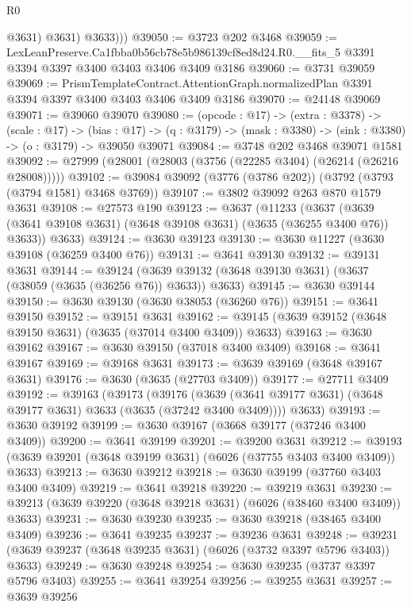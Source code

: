 \begin{lexlean}{R0}
\begin{coremodule}
              @3631)
            @3631)
          @3633)))
@39050 := @3723 @202 @3468
@39059 := LexLeanPreserve.Ca1fbba0b56cb78e5b986139cf8ed8d24.R0.__fits_5
    @3391
    @3394
    @3397
    @3400
    @3403
    @3406
    @3409
    @3186
@39060 := @3731 @39059
@39069 := PrismTemplateContract.AttentionGraph.normalizedPlan
    @3391
    @3394
    @3397
    @3400
    @3403
    @3406
    @3409
    @3186
@39070 := @24148 @39069
@39071 := @39060 @39070
@39080 := (opcode : @17) ->
  (extra : @3378) ->
  (scale : @17) ->
  (bias : @17) -> (q : @3179) -> (mask : @3380) -> (sink : @3380) -> (o : @3179) -> @39050 @39071
@39084 := @3748 @202 @3468 @39071 @1581
@39092 := @27999 (@28001 (@28003 (@3756 (@22285 @3404) (@26214 (@26216 @28008)))))
@39102 := @39084 @39092 (@3776 (@3786 @202)) (@3792 (@3793 (@3794 @1581) @3468 @3769))
@39107 := @3802 @39092 @263 @870 @1579 @3631
@39108 := @27573 @190
@39123 := @3637
    (@11233
      (@3637 (@3639 (@3641 @39108 @3631) (@3648 @39108 @3631) (@3635 (@36255 @3400 @76)) @3633))
      @3633)
@39124 := @3630 @39123
@39130 := @3630 @11227 (@3630 @39108 (@36259 @3400 @76))
@39131 := @3641 @39130
@39132 := @39131 @3631
@39144 := @39124
    (@3639 @39132 (@3648 @39130 @3631) (@3637 (@38059 (@3635 (@36256 @76)) @3633)) @3633)
@39145 := @3630 @39144
@39150 := @3630 @39130 (@3630 @38053 (@36260 @76))
@39151 := @3641 @39150
@39152 := @39151 @3631
@39162 := @39145 (@3639 @39152 (@3648 @39150 @3631) (@3635 (@37014 @3400 @3409)) @3633)
@39163 := @3630 @39162
@39167 := @3630 @39150 (@37018 @3400 @3409)
@39168 := @3641 @39167
@39169 := @39168 @3631
@39173 := @3639 @39169 (@3648 @39167 @3631)
@39176 := @3630 (@3635 (@27703 @3409))
@39177 := @27711 @3409
@39192 := @39163
    (@39173
      (@39176 (@3639 (@3641 @39177 @3631) (@3648 @39177 @3631) @3633 (@3635 (@37242 @3400 @3409))))
      @3633)
@39193 := @3630 @39192
@39199 := @3630 @39167 (@3668 @39177 (@37246 @3400 @3409))
@39200 := @3641 @39199
@39201 := @39200 @3631
@39212 := @39193 (@3639 @39201 (@3648 @39199 @3631) (@6026 (@37755 @3403 @3400 @3409)) @3633)
@39213 := @3630 @39212
@39218 := @3630 @39199 (@37760 @3403 @3400 @3409)
@39219 := @3641 @39218
@39220 := @39219 @3631
@39230 := @39213 (@3639 @39220 (@3648 @39218 @3631) (@6026 (@38460 @3400 @3409)) @3633)
@39231 := @3630 @39230
@39235 := @3630 @39218 (@38465 @3400 @3409)
@39236 := @3641 @39235
@39237 := @39236 @3631
@39248 := @39231 (@3639 @39237 (@3648 @39235 @3631) (@6026 (@3732 @3397 @5796 @3403)) @3633)
@39249 := @3630 @39248
@39254 := @3630 @39235 (@3737 @3397 @5796 @3403)
@39255 := @3641 @39254
@39256 := @39255 @3631
@39257 := @3639 @39256

\end{coremodule}
\end{lexlean}
